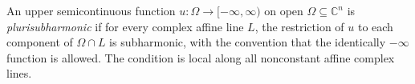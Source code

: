 
An upper semicontinuous function $u:\Omega\to[-\infty,\infty)$ on open $\Omega\subseteq\mathbb C^n$ is \emph{plurisubharmonic} if for every complex affine line $L$, the restriction of $u$ to each component of $\Omega\cap L$ is subharmonic, with the convention that the identically $-\infty$ function is allowed. The condition is local along all nonconstant affine complex lines.
